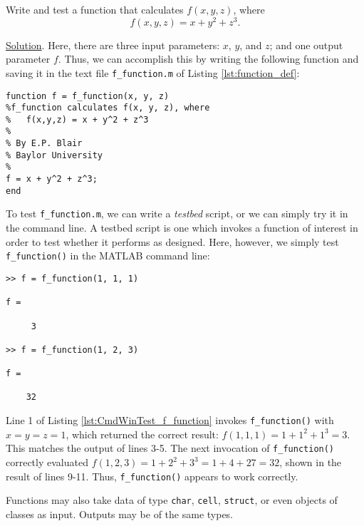 Write and test a function that calculates $f(x,y,z)$, where $$f(x,y,z) = x + y^2 + z^3 .$$

\noindent \underline{Solution}.
Here, there are three input parameters: $x$, $y$, and $z$; and one output parameter $f$. Thus, we can accomplish this by writing the following function and saving it in the text file \texttt{f\_function.m} of Listing \ref{lst:function_def}:
\begin{lstlisting}[style=Matlab-editor, caption={The code of the function-definition file \texttt{f\_function.m}.}, label={lst:function_def}]
function f = f_function(x, y, z)
%f_function calculates f(x, y, z), where
%   f(x,y,z) = x + y^2 + z^3
%
% By E.P. Blair
% Baylor University
%
f = x + y^2 + z^3;
end
\end{lstlisting}

To test \texttt{f\_function.m}, we can write a \textit{testbed} script, or we can simply try it in the command line. A testbed script is one which invokes a function of interest in order to test whether it performs as designed. Here, however, we simply test \texttt{f\_function()} in the MATLAB command line:
\begin{lstlisting}[style=Matlab-editor, caption={MATLAB Command Window input invoking \texttt{f\_function()}, along with the resulting output.}, label={lst:CmdWinTest_f_function}]
>> f = f_function(1, 1, 1)

f =

     3

>> f = f_function(1, 2, 3)

f =

    32
\end{lstlisting}
Line 1 of Listing \ref{lst:CmdWinTest_f_function} invokes \texttt{f\_function()} with $x=y=z=1$, which returned the correct result: $f(1,1,1) = 1 + 1^2 +1^3 = 3$. This matches the output of lines 3-5. The next invocation of \texttt{f\_function()} correctly evaluated $f(1,2,3) = 1 + 2^2 +3^3 = 1 + 4 + 27 = 32$, shown in the result of lines 9-11. Thus, \texttt{f\_function()} appears to work correctly.

Functions may also take data of type \texttt{char}, \texttt{cell}, \texttt{struct}, or even objects of classes as input. Outputs may be of the same types.



